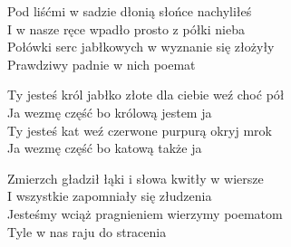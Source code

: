 \begin{text}
    Pod liśćmi w sadzie dłonią słońce nachyliłeś\\
    I w nasze ręce wpadło prosto z półki nieba\\
    Połówki serc jabłkowych w wyznanie się złożyły\\
    Prawdziwy padnie w nich poemat

    \vin Ty jesteś król jabłko złote dla ciebie weź choć pół\\
    \vin Ja wezmę część bo królową jestem ja\\
    \vin Ty jesteś kat weź czerwone purpurą okryj mrok\\
    \vin Ja wezmę część bo katową także ja

    Zmierzch gładził łąki i słowa kwitły w wiersze\\
    I wszystkie zapomniały się złudzenia\\
    Jesteśmy wciąż pragnieniem wierzymy poematom\\
    Tyle w nas raju do stracenia
\end{text}
\begin{chord}

\end{chord}
